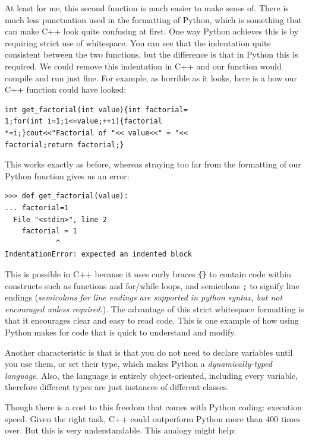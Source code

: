 At least for me, this second function is much easier to make sense of. There is much less punctuation used in the formatting of Python, which is something that can make C++ look quite confusing at first. One way Python achieves this is by requiring strict use of whitespace. You can see that the indentation quite consistent between the two functions, but the difference is that in Python this is required. We could remove this indentation in C++ and our function would compile and run just fine. For example, as horrible as it looks, here is a how our C++ function could have looked:

\begin{verbatim}
int get_factorial(int value){int factorial=
1;for(int i=1;i<=value;++i){factorial
*=i;}cout<<"Factorial of "<< value<<" = "<<
factorial;return factorial;}
\end{verbatim}

This works exactly as before, whereas straying too far from the formatting of our Python function gives us an error:


\pagebreak

\begin{verbatim}
>>> def get_factorial(value):
... factorial=1
  File "<stdin>", line 2
    factorial = 1
            ^
IndentationError: expected an indented block
\end{verbatim}

This is possible in C++ because it uses curly braces \texttt{\{\}} to contain code within constructs such as functions and for/while loops, and semicolons \texttt{;} to signify line endings (\emph{semicolons for line endings are supported in python syntax, but not encouraged unless required.}). The advantage of this strict whitespace formatting is that it encourages clear and easy to read code. This is one example of how using Python makes for code that is quick to understand and modify.

Another characteristic is that is that you do not need to declare variables until you use them, or set their type, which makes Python a \emph{dynamically-typed language}. Also, the language is entirely object-oriented, including every variable, therefore different types are just instances of different classes.

Though there is a cost to this freedom that comes with Python coding: execution speed. Given the right task, C++ could outperform Python more than 400 times over. But this is very understandable. This analogy might help:

